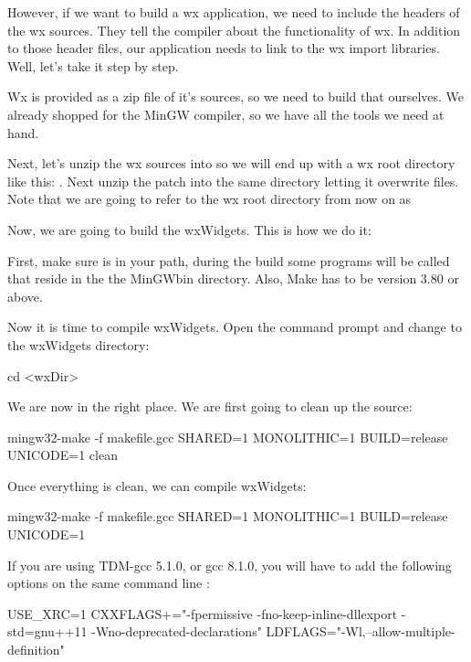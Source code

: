 However, if we want to build a wx application, we need to include the headers of the wx sources. They tell the compiler about the functionality of wx. In addition to those header files, our application needs to link to the wx import libraries. Well, let's take it step by step.

Wx is provided as a zip file of it's sources, so we need to build that ourselves. We already shopped for the MinGW compiler, so we have all the tools we need at hand.

Next, let's unzip the wx sources into  so we will end up with a wx root directory like this: . Next unzip the patch into the same directory letting it overwrite files. Note that we are going to refer to the wx root directory from now on as 

Now, we are going to build the wxWidgets. This is how we do it:

First, make sure  is in your path, during the build some programs will be called that reside in the the MinGW\osp bin directory. Also, Make has to be version 3.80 or above.

Now it is time to compile wxWidgets. Open the command prompt and change to the wxWidgets directory:

\begin{cmd}
cd <wxDir>\build\msw
\end{cmd}

We are now in the right place. We are first going to clean up the source:

\begin{cmd}
mingw32-make -f makefile.gcc SHARED=1 MONOLITHIC=1 BUILD=release UNICODE=1 clean
\end{cmd}

Once everything is clean, we can compile wxWidgets:

\begin{cmd}
mingw32-make -f makefile.gcc SHARED=1 MONOLITHIC=1 BUILD=release UNICODE=1
\end{cmd}

If you are using TDM-gcc 5.1.0, or gcc 8.1.0, you will have to add the following options on the same command line : 
\begin{cmd}
USE_XRC=1
CXXFLAGS+="-fpermissive	-fno-keep-inline-dllexport -std=gnu++11
 -Wno-deprecated-declarations"
LDFLAGS="-Wl,--allow-multiple-definition"
\end{cmd}

